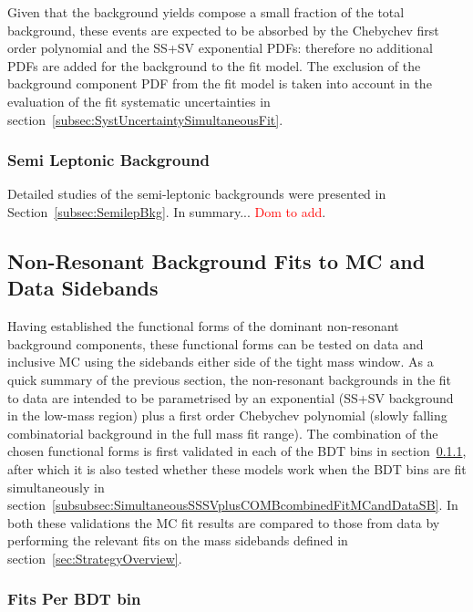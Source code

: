 Given that the \Bc background yields compose a small fraction of the total \bbmumuX background, these events are expected to be absorbed by the Chebychev first order polynomial and the SS+SV exponential PDFs: therefore no additional PDFs are added for the \Bc background to the fit model. The exclusion of the \Bc background component PDF from the fit model is taken into account in the evaluation of the fit systematic uncertainties in section~\ref{subsec:SystUncertaintySimultaneousFit}.



\subsubsection{Semi Leptonic Background}
\label{subsubsec:SigExtractSemiLep}
Detailed studies of the semi-leptonic backgrounds were presented in Section~\ref{subsec:SemilepBkg}. 
In summary... \textcolor{red}{Dom to add}. 

\clearpage

\subsection{Non-Resonant Background Fits to MC and Data Sidebands}
\label{subsubsec:FitsMcDataSB}

Having established the functional forms of the dominant non-resonant background components, these functional forms can be tested on data and inclusive MC using the sidebands either side of the tight mass window. 
As a quick summary of the previous section, the non-resonant backgrounds in the fit to data are intended to be parametrised by an exponential (SS+SV background in the low-mass region) plus a first order Chebychev polynomial (slowly falling combinatorial background in the full mass fit range). 
The combination of the chosen functional forms is first validated in each of the BDT bins in section~\ref{subsubsec:SSSVplusCOMBcombinedFitMCandDataSB}, after which it is also tested whether these models work when the BDT bins are fit simultaneously in section~\ref{subsubsec:SimultaneousSSSVplusCOMBcombinedFitMCandDataSB}. 
In both these validations the MC fit results are compared to those from data by performing the relevant fits on the mass sidebands defined in section~\ref{sec:StrategyOverview}.

\subsubsection{Fits Per BDT bin}
\label{subsubsec:SSSVplusCOMBcombinedFitMCandDataSB}

